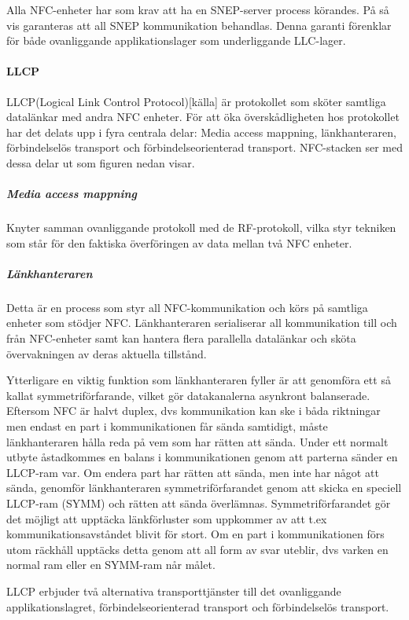 \documentclass[11pt]{article}
\begin{document}
Alla NFC-enheter har som krav att ha en SNEP-server process körandes. På så vis garanteras att all SNEP kommunikation behandlas. Denna garanti förenklar för både ovanliggande applikationslager som underliggande LLC-lager.

\paragraph{LLCP}
LLCP(Logical Link Control Protocol)[källa] är protokollet som sköter samtliga datalänkar med andra NFC enheter. För att öka överskådligheten hos protokollet har det delats upp i fyra centrala delar: Media access mappning, länkhanteraren, förbindelselös transport och förbindelseorienterad transport. NFC-stacken ser med dessa delar ut som figuren nedan visar.


\subparagraph{Media access mappning}
Knyter samman ovanliggande protokoll med de RF-protokoll, vilka styr tekniken som står för den faktiska överföringen av data mellan två NFC enheter. 

\subparagraph{Länkhanteraren}
Detta är en process som styr all NFC-kommunikation och körs på samtliga enheter som stödjer NFC. Länkhanteraren serialiserar all kommunikation till och från NFC-enheter samt kan hantera flera parallella datalänkar och sköta övervakningen av deras aktuella tillstånd.

Ytterligare en viktig funktion som länkhanteraren fyller är att genomföra ett så kallat symmetriförfarande, vilket gör datakanalerna asynkront balanserade. Eftersom NFC är halvt duplex, dvs kommunikation kan ske i båda riktningar men endast en part i kommunikationen får sända samtidigt, måste länkhanteraren hålla reda på vem som har rätten att sända. Under ett normalt utbyte åstadkommes en balans i kommunikationen genom att parterna sänder en LLCP-ram var. Om endera part har rätten att sända, men inte har något att sända, genomför länkhanteraren symmetriförfarandet genom att skicka en speciell LLCP-ram (SYMM) och rätten att sända överlämnas. Symmetriförfarandet gör det möjligt att upptäcka länkförluster som uppkommer av att t.ex kommunikationsavståndet blivit för stort. Om en part i kommunikationen förs utom räckhåll upptäcks detta genom att all form av svar uteblir, dvs varken en normal ram eller en SYMM-ram når målet.

LLCP erbjuder två alternativa transporttjänster till det ovanliggande applikationslagret, förbindelseorienterad transport och förbindelselös transport.
\end{document}
